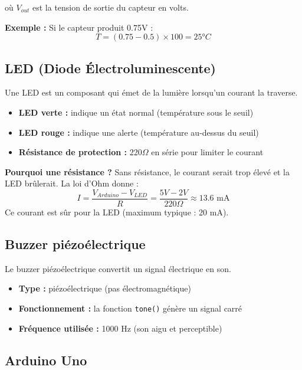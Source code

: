 \documentclass[12pt, a4paper]{article}
\begin{document}
où $V_{out}$ est la tension de sortie du capteur en volts.

\textbf{Exemple :} Si le capteur produit 0.75V :
$$T = (0.75 - 0.5) \times 100 = 25°C$$

\subsection{LED (Diode Électroluminescente)}

Une LED est un composant qui émet de la lumière lorsqu'un courant la traverse.

\begin{itemize}
    \item \textbf{LED verte :} indique un état normal (température sous le seuil)
    \item \textbf{LED rouge :} indique une alerte (température au-dessus du seuil)
    \item \textbf{Résistance de protection :} 220$\Omega$ en série pour limiter le courant
\end{itemize}

\textbf{Pourquoi une résistance ?}
Sans résistance, le courant serait trop élevé et la LED brûlerait. La loi d'Ohm donne :
\begin{equation}
    I = \frac{V_{Arduino} - V_{LED}}{R} = \frac{5V - 2V}{220\Omega} \approx 13.6 \text{ mA}
\end{equation}
Ce courant est sûr pour la LED (maximum typique : 20 mA).

\subsection{Buzzer piézoélectrique}

Le buzzer piézoélectrique convertit un signal électrique en son.

\begin{itemize}
    \item \textbf{Type :} piézoélectrique (pas électromagnétique)
    \item \textbf{Fonctionnement :} la fonction \texttt{tone()} génère un signal carré
    \item \textbf{Fréquence utilisée :} 1000 Hz (son aigu et perceptible)
\end{itemize}

\subsection{Arduino Uno}
\end{document}
